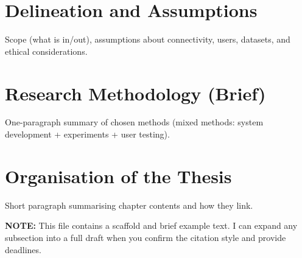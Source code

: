 \section{Delineation and Assumptions}
\noindent Scope (what is in/out), assumptions about connectivity, users, datasets, and ethical considerations.

\section{Research Methodology (Brief)}
\noindent One-paragraph summary of chosen methods (mixed methods: system development + experiments + user testing).

\section{Organisation of the Thesis}
\noindent Short paragraph summarising chapter contents and how they link.

\vspace{1em}
\textbf{NOTE:} This file contains a scaffold and brief example text. I can expand any subsection into a full draft when you confirm the citation style and provide deadlines.
